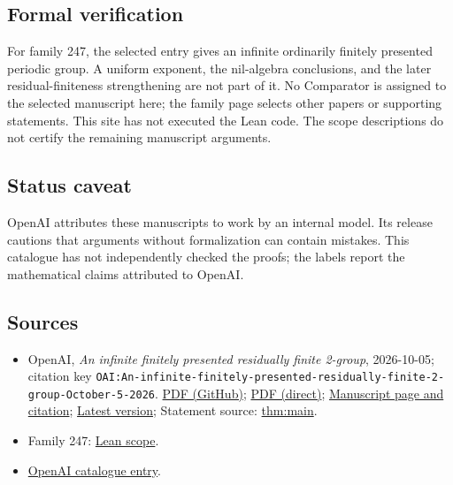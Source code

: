\documentclass[11pt]{article}
\begin{document}
\subsection{Formal verification}
For family 247, the selected entry gives an infinite ordinarily finitely presented periodic group. A uniform exponent, the nil-algebra conclusions, and the later residual-finiteness strengthening are not part of it. No Comparator is assigned to the selected manuscript here; the family page selects other papers or supporting statements. This site has not executed the Lean code. The scope descriptions do not certify the remaining manuscript arguments.

\subsection{Status caveat}
OpenAI attributes these manuscripts to work by an internal model. Its release cautions that arguments without formalization can contain mistakes. This catalogue has not independently checked the proofs; the labels report the mathematical claims attributed to OpenAI.

\subsection{Sources}
\begin{itemize}
\item OpenAI, \emph{An infinite finitely presented residually finite 2-group}, 2026-10-05; citation key \texttt{OAI:An-infinite-finitely-presented-residually-finite-2-group-October-5-2026}. \href{https://github.com/openai/math/blob/adc7f1241b42e322a6451854ab7e4b4c146bf78a/preprints/An-infinite-finitely-presented-residually-finite-2-group-October-5-2026/residually-finite-torsion.pdf}{PDF (GitHub)}; \href{https://github.com/openai/math/raw/adc7f1241b42e322a6451854ab7e4b4c146bf78a/preprints/An-infinite-finitely-presented-residually-finite-2-group-October-5-2026/residually-finite-torsion.pdf}{PDF (direct)}; \href{https://github.com/openai/math/blob/adc7f1241b42e322a6451854ab7e4b4c146bf78a/preprints/An-infinite-finitely-presented-residually-finite-2-group-October-5-2026/README.md}{Manuscript page and citation}; \href{https://github.com/openai/math/blob/main/preprints/An-infinite-finitely-presented-residually-finite-2-group-October-5-2026/residually-finite-torsion.pdf}{Latest version}; Statement source: \href{https://github.com/openai/math/blob/adc7f1241b42e322a6451854ab7e4b4c146bf78a/preprints/An-infinite-finitely-presented-residually-finite-2-group-October-5-2026/build/sections/introduction.tex\#L12}{thm:main}.
\item Family 247: \href{https://github.com/openai/math/blob/adc7f1241b42e322a6451854ab7e4b4c146bf78a/lean/docs/247.md}{Lean scope}.
\item \href{https://github.com/openai/math/blob/adc7f1241b42e322a6451854ab7e4b4c146bf78a/CONTENTS.md}{OpenAI catalogue entry}.
\end{itemize}
\end{document}
